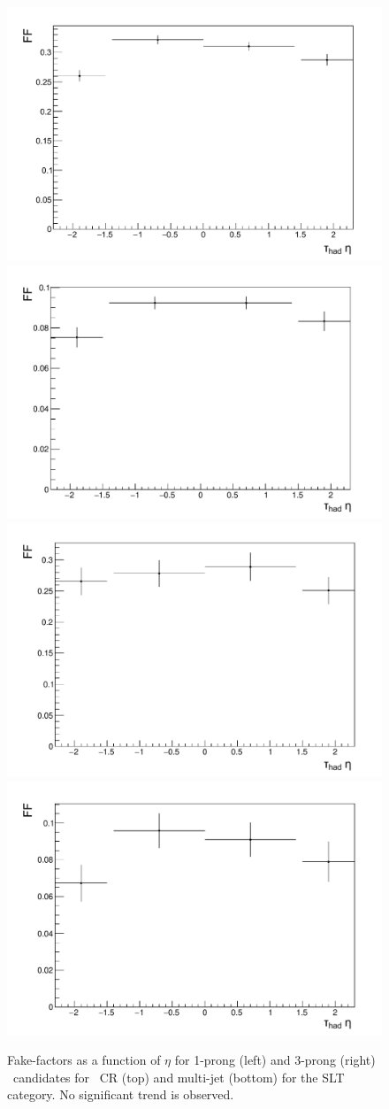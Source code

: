 \begin{figure}
\centering
\includegraphics[width=.4\textwidth]{DiHiggs/plots/lephadFF/SLT/FF_All_Preselection_Np1_HighMtCR_2tag_Tau0Eta}
\includegraphics[width=.4\textwidth]{DiHiggs/plots/lephadFF/SLT/FF_All_Preselection_Np3_HighMtCR_2tag_Tau0Eta}\\
\includegraphics[width=.4\textwidth]{DiHiggs/plots/lephadFF/SLT/FF_All_Preselection_Np1_CR_2tag_Tau0Eta}
\includegraphics[width=.4\textwidth]{DiHiggs/plots/lephadFF/SLT/FF_All_Preselection_Np3_CR_2tag_Tau0Eta} \\
\caption{Fake-factors as a function of $\eta$ for 1-prong (left) and 3-prong (right) \tauhad\ candidates for \ttbar\ CR (top) 
and multi-jet (bottom) for the \lephad SLT category. No significant trend is observed.}
\label{fig:lhFF_eta_SLT}
\end{figure}

